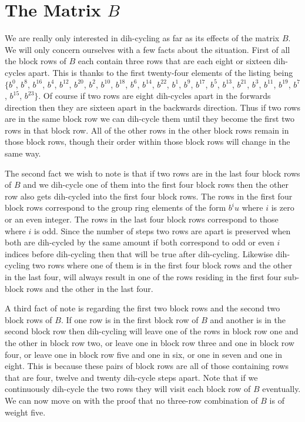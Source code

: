 \section{The Matrix $B$}
We are really only interested in dih-cycling as far as its effects of the matrix $B$.
We will only concern ourselves with a few facts about the situation.
First of all the block rows of $B$ each contain three rows that are each eight or sixteen dih-cycles apart.
This is thanks to the first twenty-four elements of the listing being $ \{ b^{ 0 } $, $ b^{ 8 } $, $ b^{ 16 } $, $ b^{ 4 } $, $ b^{ 12 } $, $ b^{ 20 } $, $ b^{ 2 } $, $ b^{ 10 } $, $ b^{ 18 } $, $ b^{ 6 } $, $ b^{ 14 } $, $ b^{ 22 } $, $ b^{ 1 } $, $ b^{ 9 } $, $ b^{ 17 } $, $ b^{ 5 } $, $ b^{ 13 } $, $ b^{ 21 } $, $ b^{ 3 } $, $ b^{ 11 } $, $ b^{ 19 } $, $ b^{ 7 } $, $ b^{ 15 } $, $ b^{ 23 } \}$.
Of course if two rows are eight dih-cycles apart in the forwards direction then they are sixteen apart in the backwards direction.
Thus if two rows are in the same block row we can dih-cycle them until they become the first two rows in that block row.
All of the other rows in the other block rows remain in those block rows, though their order within those block rows will change in the same way.

The second fact we wish to note is that if two rows are in the last four block rows of $B$ and we dih-cycle one of them into the first four block rows then the other row also gets dih-cycled into the first four block rows.
The rows in the first four block rows correspond to the group ring elements of the form $b^i u$ where $i$ is zero or an even integer.
The rows in the last four block rows correspond to those where $i$ is odd.
Since the number of steps two rows are apart is preserved when both are dih-cycled by the same amount if both correspond to odd or even $i$ indices before dih-cycling then that will be true after dih-cycling.
Likewise dih-cycling two rows where one of them is in the first four block rows and the other in the last four, will always result in one of the rows residing in the first four sub-block rows and the other in the last four.

A third fact of note is regarding the first two block rows and the second two block rows of $B$.
If one row is in the first block row of $B$ and another is in the second block row then dih-cycling will leave one of the rows in block row one and the other in block row two, or leave one in block row three and one in block row four, or leave one in block row five and one in six, or one in seven and one in eight.
This is because these pairs of block rows are all of those containing rows that are four, twelve and twenty dih-cycle steps apart.
Note that if we continuously dih-cycle the two rows they will visit each block row of $B$ eventually.
We can now move on with the proof that no three-row combination of $B$ is of weight five.

